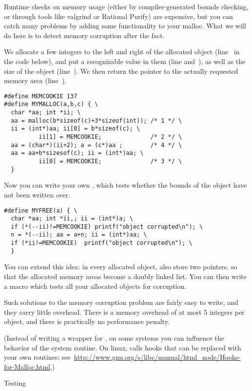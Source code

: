 Runtime checks on memory usage (either by compiler-generated bounds
checking, or through tools like
valgrind or Rational Purify) are expensive, but you can catch many
problems by adding some functionality to your malloc.
What we will do here is to detect memory corruption
after the fact. 

We allocate a few integers to the left and right of the
allocated object (line~ in the code below), 
and put a recognizable value in them (line  and~), as well as the
size of the object (line~). We then return the pointer to the
actually requested memory area (line~).
\begin{verbatim}
#define MEMCOOKIE 137
#define MYMALLOC(a,b,c) { \
  char *aa; int *ii; \
  aa = malloc(b*sizeof(c)+3*sizeof(int)); /* 1 */ \
  ii = (int*)aa; ii[0] = b*sizeof(c); \
          ii[1] = MEMCOOKIE;              /* 2 */ \
  aa = (char*)(ii+2); a = (c*)aa ;        /* 4 */ \
  aa = aa+b*sizesof(c); ii = (int*)aa; \
          ii[0] = MEMCOOKIE;              /* 3 */ \
  }
\end{verbatim}
Now you can write your own \n{free}, which tests whether the bounds of
the object have not been written over.
\begin{verbatim}
#define MYFREE(a) { \
  char *aa; int *ii,; ii = (int*)a; \
  if (*(--ii)!=MEMCOOKIE) printf("object corrupted\n"); \
  n = *(--ii); aa = a+n; ii = (int*)aa; \
  if (*ii!=MEMCOOKIE)  printf("object corrupted\n"); \
  }
\end{verbatim}
You can extend this idea: in every allocated object, also store two
pointers, so that the allocated memory areas become a doubly linked
list. You can then write a macro  which tests all your
allocated objects for corruption.

Such solutions to the memory corruption problem are fairly easy to
write, and they carry little overhead. There is a memory overhead of
at most 5 integers per object, and there is practically no performance
penalty.

(Instead of writing a wrapper for , on some systems you can
influence the behavior of the system routine. On linux, \n{malloc}
calls hooks that can be replaced with your own routines;
see~\url{http://www.gnu.org/s/libc/manual/html_node/Hooks-for-Malloc.html}.)

\Level 0 {Testing}

